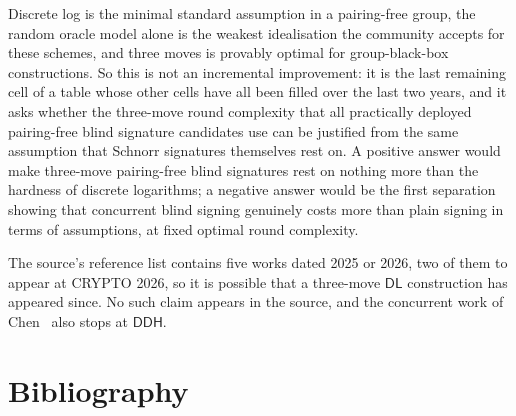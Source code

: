 \documentclass{aicr-conjecture}
\newcommand{\DL}{\mathsf{DL}}
\newcommand{\DDH}{\mathsf{DDH}}
\begin{document}
\begin{remark}\label{rem:consequence}
Discrete log is the minimal standard assumption in a pairing-free group,
the random oracle model alone is the weakest idealisation the community
accepts for these schemes, and three moves is provably optimal for
group-black-box constructions. So this is not an incremental improvement:
it is the last remaining cell of a table whose other cells have all been
filled over the last two years, and it asks whether the three-move round
complexity that all practically deployed pairing-free blind signature
candidates use can be justified from the same assumption that Schnorr
signatures themselves rest on. A positive answer would make three-move
pairing-free blind signatures rest on nothing more than the hardness of
discrete logarithms; a negative answer would be the first separation
showing that concurrent blind signing genuinely costs more than plain
signing in terms of assumptions, at fixed optimal round complexity.
\end{remark}

\begin{remark}\label{rem:fast}
The source's reference list contains five works dated 2025 or 2026, two of
them to appear at CRYPTO 2026, so it is possible that a three-move $\DL$
construction has appeared since. No such claim appears in the source, and
the concurrent work of Chen~\cite{Che26} also stops at $\DDH$.
\end{remark}

\section{Bibliography}
\end{document}
